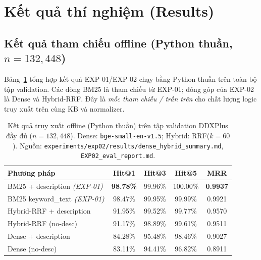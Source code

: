 
\section{Kết quả thí nghiệm (Results)}
\subsection{Kết quả tham chiếu offline (Python thuần, $n=132{,}448$)}
Bảng~\ref{tab:offline} tổng hợp kết quả EXP-01/EXP-02 chạy bằng Python thuần trên toàn bộ tập validation. Các dòng BM25 là tham chiếu từ EXP-01; đóng góp của EXP-02 là Dense và Hybrid-RRF. Đây là \textit{mốc tham chiếu / trần trên} cho chất lượng logic truy xuất trên cùng KB và normalizer.

\begin{table}[H]
  \centering
  \small
  \caption{Kết quả truy xuất offline (Python thuần) trên tập validation DDXPlus đầy đủ ($n=132{,}448$). Dense: \texttt{bge-small-en-v1.5}; Hybrid: RRF($k=60$). Nguồn: \texttt{experiments/exp02/results/dense\_hybrid\_summary.md}, \texttt{EXP02\_eval\_report.md}.}
  \label{tab:offline}
  \begin{tabular}{lcccc}
    \toprule
    \textbf{Phương pháp}                 & \textbf{Hit@1}   & \textbf{Hit@3} & \textbf{Hit@5} & \textbf{MRR}    \\
    \midrule
    BM25 + description \textit{(EXP-01)} & \textbf{98.78\%} & 99.96\%        & 100.00\%       & \textbf{0.9937} \\
    BM25 keyword\_text \textit{(EXP-01)} & 98.47\%          & 99.95\%        & 99.99\%        & 0.9921          \\
    Hybrid-RRF + description             & 91.95\%          & 99.52\%        & 99.77\%        & 0.9570          \\
    Hybrid-RRF (no-desc)                 & 91.17\%          & 98.89\%        & 99.61\%        & 0.9511          \\
    Dense + description                  & 84.28\%          & 95.48\%        & 98.46\%        & 0.9027          \\
    Dense (no-desc)                      & 83.11\%          & 94.41\%        & 96.82\%        & 0.8911          \\
    \bottomrule
  \end{tabular}
\end{table}

